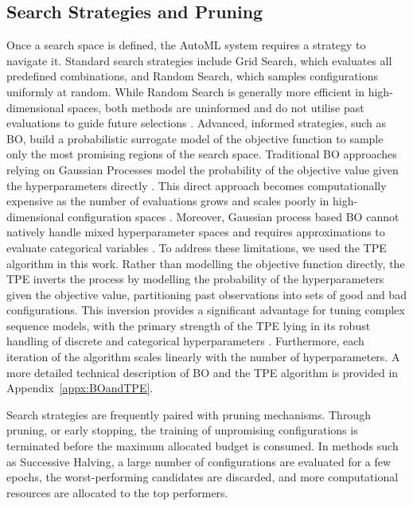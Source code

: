 \subsection{Search Strategies and Pruning}
\label{subsec:searchstrat}
Once a search space is defined, the \ac{AutoML} system requires a strategy to navigate it. Standard search strategies include Grid Search, which evaluates all predefined combinations, and Random Search, which samples configurations uniformly at random. While Random Search is generally more efficient in high-dimensional spaces, %
both methods are uninformed and do not utilise past evaluations to guide future selections \parencite{hutter2019automated}. Advanced, informed strategies, such as \acf{BO}, build a probabilistic surrogate model of the objective function to sample only the most promising regions of the search space. %
Traditional \ac{BO} approaches relying on Gaussian Processes model the probability of the objective value given the hyperparameters directly \parencite{hutter2019automated}.
This direct approach becomes computationally expensive as the number of evaluations grows and scales poorly in high-dimensional configuration spaces \parencite{hutter2019automated}. Moreover, Gaussian process based \ac{BO} cannot natively handle mixed hyperparameter spaces and requires approximations to evaluate categorical variables \parencite{AutoMLHoos}. 
To address these limitations, we used the \ac{TPE} algorithm \parencite{bergstra2011algorithms} in this work.
Rather than modelling the objective function directly, the \ac{TPE} inverts the process by modelling the probability of the hyperparameters given the objective value, partitioning past observations into sets of good and bad configurations.
This inversion provides a significant advantage for tuning complex sequence models, with the primary strength of the \ac{TPE} lying in its robust handling of discrete and categorical hyperparameters \parencite{AutoMLHoos}.
Furthermore, each iteration of the algorithm scales linearly with the number of hyperparameters.
A more detailed technical description of \ac{BO} and the \ac{TPE} algorithm is provided in Appendix~\ref{appx:BOandTPE}.

Search strategies are frequently paired with pruning mechanisms.
Through pruning, or early stopping, the training of unpromising configurations is terminated before the maximum allocated budget is consumed.
In methods such as Successive Halving, a large number of configurations are evaluated for a few epochs, the worst-performing candidates are discarded, and more computational resources are allocated to the top performers.

